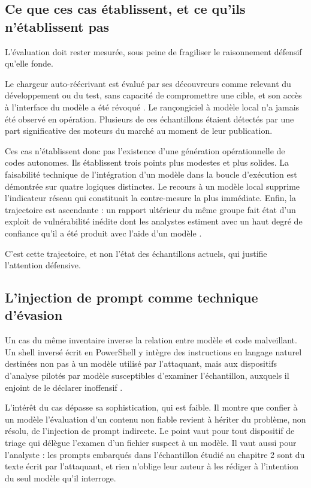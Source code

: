 \subsection{Ce que ces cas établissent, et ce qu'ils n'établissent pas}

L'évaluation doit rester mesurée, sous peine de fragiliser le raisonnement défensif qu'elle fonde.

Le chargeur auto-réécrivant est évalué par ses découvreurs comme relevant du développement ou du test, sans capacité de compromettre une cible, et son accès à l'interface du modèle a été révoqué \cite{gtigAI}. Le rançongiciel à modèle local n'a jamais été observé en opération. Plusieurs de ces échantillons étaient détectés par une part significative des moteurs du marché au moment de leur publication.

Ces cas n'établissent donc pas l'existence d'une génération opérationnelle de codes autonomes. Ils établissent trois points plus modestes et plus solides. La faisabilité technique de l'intégration d'un modèle dans la boucle d'exécution est démontrée sur quatre logiques distinctes. Le recours à un modèle local supprime l'indicateur réseau qui constituait la contre-mesure la plus immédiate. Enfin, la trajectoire est ascendante : un rapport ultérieur du même groupe fait état d'un exploit de vulnérabilité inédite dont les analystes estiment avec un haut degré de confiance qu'il a été produit avec l'aide d'un modèle \cite{gtig2026b}.

C'est cette trajectoire, et non l'état des échantillons actuels, qui justifie l'attention défensive.

\subsection{L'injection de prompt comme technique d'évasion}

Un cas du même inventaire inverse la relation entre modèle et code malveillant. Un shell inversé écrit en PowerShell y intègre des instructions en langage naturel destinées non pas à un modèle utilisé par l'attaquant, mais aux dispositifs d'analyse pilotés par modèle susceptibles d'examiner l'échantillon, auxquels il enjoint de le déclarer inoffensif \cite{gtigAI}.

L'intérêt du cas dépasse sa sophistication, qui est faible. Il montre que confier à un modèle l'évaluation d'un contenu non fiable revient à hériter du problème, non résolu, de l'injection de prompt indirecte. Le point vaut pour tout dispositif de triage qui délègue l'examen d'un fichier suspect à un modèle. Il vaut aussi pour l'analyste : les prompts embarqués dans l'échantillon étudié au chapitre 2 sont du texte écrit par l'attaquant, et rien n'oblige leur auteur à les rédiger à l'intention du seul modèle qu'il interroge.
